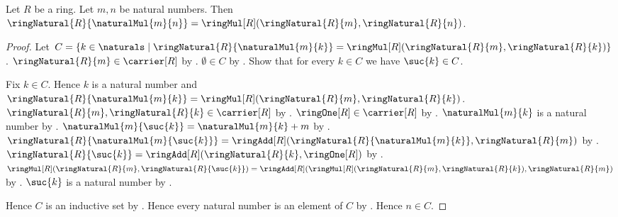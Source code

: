 \begin{theorem}\label{ring_natural_multiplication}
    Let $R$ be a ring.
    Let $m,n$ be natural numbers.
    Then $\ringNatural{R}{\naturalMul{m}{n}}=
        \ringMul[R](\ringNatural{R}{m},\ringNatural{R}{n})$.
\end{theorem}
\begin{proof}
    Let $C=\{k\in\naturals\mid
        \ringNatural{R}{\naturalMul{m}{k}}=
            \ringMul[R](\ringNatural{R}{m},\ringNatural{R}{k})\}$.
    $\ringNatural{R}{m}\in\carrier[R]$ by
        .
    $\emptyset\in C$ by
        .
    Show that for every $k\in C$ we have $\suc{k}\in C$.
    \begin{subproof}
        Fix $k\in C$.
        Hence $k$ is a natural number and
            $\ringNatural{R}{\naturalMul{m}{k}}=
                \ringMul[R](\ringNatural{R}{m},
                    \ringNatural{R}{k})$.
        $\ringNatural{R}{m},\ringNatural{R}{k}\in\carrier[R]$ by
            .
        $\ringOne[R]\in\carrier[R]$ by .
        $\naturalMul{m}{k}$ is a natural number by
            .
        $\naturalMul{m}{\suc{k}}=\naturalMul{m}{k}+m$ by
            .
        $\ringNatural{R}{\naturalMul{m}{\suc{k}}}=
            \ringAdd[R](
                \ringNatural{R}{\naturalMul{m}{k}},
                \ringNatural{R}{m})$ by
            .
        $\ringNatural{R}{\suc{k}}=
            \ringAdd[R](\ringNatural{R}{k},\ringOne[R])$ by
            .
        $\ringMul[R](\ringNatural{R}{m},
                \ringNatural{R}{\suc{k}})=
            \ringAdd[R](
                \ringMul[R](\ringNatural{R}{m},
                    \ringNatural{R}{k}),
                \ringNatural{R}{m})$ by
            .
        $\suc{k}$ is a natural number by .
    \end{subproof}
    Hence $C$ is an inductive set by .
    Hence every natural number is an element of $C$ by
        .
    Hence $n\in C$.
\end{proof}

